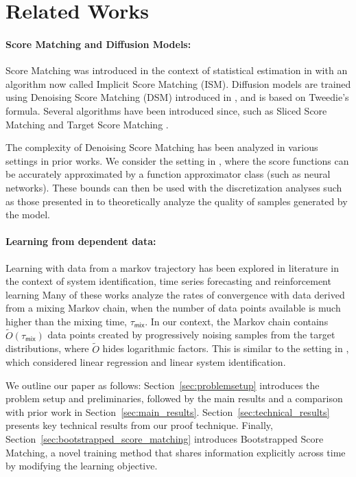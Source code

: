 \section{Related Works}
\label{subsec:related_works}
\paragraph{Score Matching and Diffusion Models:} Score Matching was introduced in the context of statistical estimation in \cite{hyvarinen2005estimation} with an algorithm now called Implicit Score Matching (ISM). Diffusion models are trained using Denoising Score Matching (DSM) introduced in \cite{vincent2011connection}, and is based on Tweedie's formula. Several algorithms have been introduced since, such as Sliced Score Matching \cite{song2020sliced} and Target Score Matching \cite{de2024target}.

The complexity of Denoising Score Matching has been analyzed in various settings \cite{chen2023score,oko2023diffusion,gupta2023sample,block2020generative} in prior works. We consider the setting in \cite{gupta2023sample,block2020generative}, where the score functions can be accurately approximated by a function approximator class (such as neural networks). These bounds can then be used with the discretization analyses such as those presented in \cite{benton2024nearly,chen2022sampling,lee2023convergence} to theoretically analyze the quality of samples generated by the model. 

\paragraph{Learning from dependent data:} Learning with data from a markov trajectory has been explored in literature in the context of system identification, time series forecasting and reinforcement learning \cite{duchi2012ergodic, simchowitz2018learning,nagaraj2020least,kowshik2021near,tu2024learning,ziemann2022learning,bhandari2018finite,kumar2024streaming,srikant2024rates}
Many of these works analyze the rates of convergence with data derived from a mixing Markov chain, when the number of data points available is much higher than the mixing time, $\tau_{\mathsf{mix}}$. In our context, the Markov chain contains $\tilde{O}(\tau_{\mathsf{mix}})$ data points created by progressively noising samples from the target distributions, where $\tilde{O}$ hides logarithmic factors. This is similar to the setting in \cite{tu2024learning}, which considered linear regression and linear system identification.

We outline our paper as follows: Section~\ref{sec:problemsetup} introduces the problem setup and preliminaries, followed by the main results and a comparison with prior work in Section~\ref{sec:main_results}. Section~\ref{sec:technical_results} presents key technical results from our proof technique. Finally, Section~\ref{sec:bootstrapped_score_matching} introduces Bootstrapped Score Matching, a novel training method that shares information explicitly across time by modifying the learning objective.
